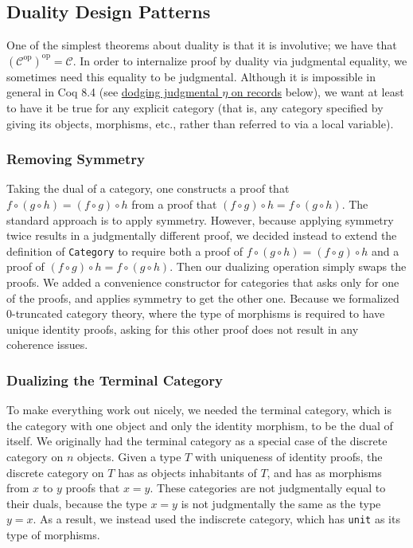 \documentclass[runningheads]{llncs}
\newcommand{\cat}[1]{\ensuremath{\mathcal{#1}}}
\begin{document}
  \subsection{Duality Design Patterns}
    One of the simplest theorems about duality is that it is involutive; we have that $(\cat{C}^{\text{op}})^{\text{op}} = \cat{C}$.  In order to internalize proof by duality via judgmental equality, we sometimes need this equality to be judgmental.  Although it is impossible in general in Coq 8.4 (see \hyperref[sec:no-judgmental-eta]{dodging judgmental \texorpdfstring{$\eta$}{η} on records} below), we want at least to have it be true for any explicit category (that is, any category specified by giving its objects, morphisms, etc., rather than referred to via a local variable).

    \subsubsection{Removing Symmetry} \label{sec:remove-symmetry}
      Taking the dual of a category, one constructs a proof that $f \circ (g \circ h) = (f \circ g) \circ h$ from a proof that $(f \circ g) \circ h = f \circ (g \circ h)$.  The standard approach is to apply symmetry.  However, because applying symmetry twice results in a judgmentally different proof, we decided instead to extend the definition of \texttt{Category} to require both a proof of $f \circ (g \circ h) = (f \circ g) \circ h$ and a proof of $(f \circ g) \circ h = f \circ (g \circ h)$.  Then our dualizing operation simply swaps the proofs.  We added a convenience constructor for categories that asks only for one of the proofs, and applies symmetry to get the other one.  Because we formalized 0-truncated category theory, where the type of morphisms is required to have unique identity proofs, asking for this other proof does not result in any coherence issues.

    \subsubsection{Dualizing the Terminal Category}
      To make everything work out nicely, we needed the terminal category, which is the category with one object and only the identity morphism, to be the dual of itself.  We originally had the terminal category as a special case of the discrete category on $n$ objects.  Given a type $T$ with uniqueness of identity proofs, the discrete category on $T$ has as objects inhabitants of $T$, and has as morphisms from $x$ to $y$ proofs that $x = y$.  These categories are not judgmentally equal to their duals, because the type $x = y$ is not judgmentally the same as the type $y = x$.  As a result, we instead used the indiscrete category, which has \texttt{unit} as its type of morphisms.
\end{document}
